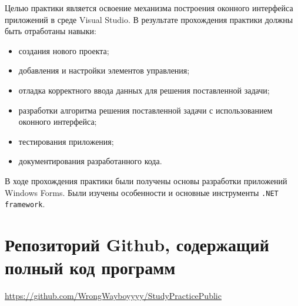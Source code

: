 \documentclass[bachelor, och, pract]{SCWorks}
\begin{document}


\tableofcontents






\intro

Целью практики является освоение механизма построения оконного интерфейса приложений в среде Visual Studio.
В результате прохождения практики должны быть отработаны навыки:
\begin{itemize}
    \item создания нового проекта;
    \item добавления и настройки элементов управления;
    \item отладка корректного ввода данных для решения поставленной задачи;
    \item разработки алгоритма решения поставленной задачи с использованием
    оконного интерфейса;
    \item тестирования приложения;
    \item документирования разработанного кода.
\end{itemize}











\conclusion

В ходе прохождения практики были получены основы разработки приложений
Windows Forms. Были изучены особенности и основные инструменты
\verb|.NET framework|.





\appendix

\section{Репозиторий Github, содержащий полный код программ}\label{app:repos}

\href{https://github.com/WrongWayboyyyy/StudyPracticePublic}{https://github.com/WrongWayboyyyy/StudyPracticePublic}
\end{document}
